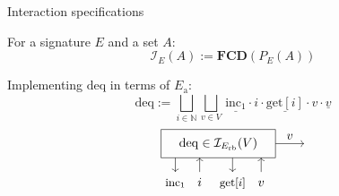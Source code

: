 \documentclass[aspectratio=54]{beamer}
\newcommand{\kw}[1]{\ensuremath{ \mathrm{#1} }}
\newcommand{\deqpic}[3]{%
  \begin{tikzpicture}[scale=0.4]
    \draw (-4,-1) rectangle (4,1);
    \node (x) at (0,0) {$#1$};
    \draw[->] (-3, -1) -- (-3, -2);
    \node[anchor=base] at (-3, -3) {\small $\kw{inc}_1$};
    \draw[<-] (-1.3, -1) -- (-1.3, -2);
    \node[anchor=base] at (-1.3, -3) {$#2$};
    \draw[->] (1, -1) -- (1, -2);
    \node[anchor=base] at (1, -3) {\small $\kw{get}[#2]$};
    \draw[<-] (3, -1) -- (3, -2);
    \node[anchor=base] at (3, -3) {$#3$};
    \draw[->] (4,0) -- node[above] {$#3$} (6,0);
  \end{tikzpicture}%
}
\begin{document}
\begin{frame}{Interaction specifications} %
  \begin{definition}
    For a signature $E$ and a set $A$:
    \[
      \mathcal{I}_E(A) := \mathbf{FCD}(P_E(A))
    \]
  \end{definition}
  \pause
  \begin{example}
    Implementing $\kw{deq}$ in terms of $E_\kw{a}$:
    \[
      \kw{deq} :=
        \bigsqcup_{i \in \mathbb{N}}
        \bigsqcup_{v \in V}
          \, \underline{\kw{inc}_1} \cdot i \cdot
             \underline{\kw{get}[i]} \cdot v \cdot \underline{v}
    \]
    \[
      \deqpic{\kw{deq} \in \mathcal{I}_{E_\kw{rb}}(V)}{i}{v}
    \]
  \end{example}
\end{frame}
\end{document}
